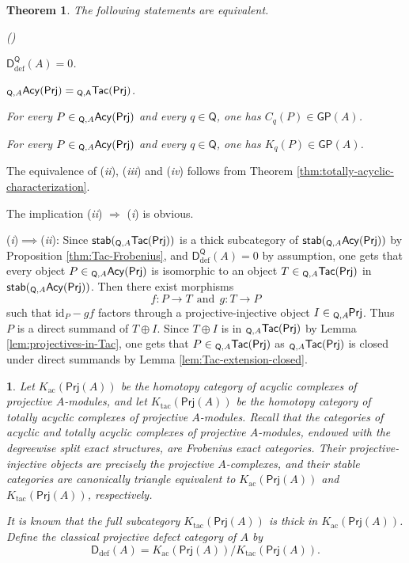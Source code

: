 \documentclass{amsart}
\theoremstyle{bfupright head,slanted body}
\theoremstyle{bfupright head,upright body}
\theoremstyle{fixed bf head,slanted body}
\newtheorem{thm}[res]{Theorem}          \newtheorem*{thm*}{Theorem}
\theoremstyle{fixed bf head,upright body}
\theoremstyle{numbered paragraph}
\newtheorem{ipg}[res]{}
\newlength{\thmlistleft}        %
\newlength{\thmlistright}       %
\newlength{\thmlistpartopsep}   %
\newlength{\thmlisttopsep}      %
\newlength{\thmlistparsep}      %
\newlength{\thmlistitemsep}     %
\newcounter{eqc}
\newenvironment{eqc}{\begin{list}{\upshape (\textit{\roman{eqc}})}%
		{\usecounter{eqc}%
			\setlength{\leftmargin}{\thmlistleft}%
			\setlength{\labelwidth}{\thmlistleft}%
			\setlength{\rightmargin}{\thmlistright}%
			\setlength{\partopsep}{\thmlistpartopsep}%
			\setlength{\topsep}{\thmlisttopsep}%
			\setlength{\parsep}{\thmlistparsep}%
			\setlength{\itemsep}{\thmlistitemsep}}}%
	{\end{list}}%
\newenvironment{prf*}[1][Proof]{%
	\begin{proof}[\bf #1]
		\setcounter{equation}{0}
		\renewcommand{\theequation}{\arabic{equation}}}
	{\end{proof}
}
\newcommand{\eqclbl}[1]{{\upshape(\textit{#1})}}
\newcommand{\proofofimp}[3][:]{\mbox{\eqclbl{#2}$\!\implies\!$\eqclbl{#3}#1}}
\numberwithin{equation}{res}
\newcommand{\GP}[1]{\mathsf{GP}(#1)}
\newcommand{\TacQ}{{}_{\Q,A}\mathsf{Tac}(\sf Prj)}
\newcommand{\AcQ}{{}_{\Q,A}\mathsf{Acy}(\sf Prj)}
\newcommand{\Prj}[1]{\mathsf{Prj}(#1)}
\newcommand{\Q}{\mathsf{Q}}
\newcommand{\id}{\mathrm{id}}
\newcommand{\lPrj}[1]{{}_{#1}\mspace{-1mu}{\sf{Prj}}}
\begin{document}
\begin{thm}\label{cor:defect-zero-criterion}
The following statements are equivalent.
\begin{eqc}
\item $\mathsf D_{\mathrm{def}}^{\Q}(A)=0$.
\item $\AcQ=\TacQ$.
\item For every $P\in\AcQ$ and every $q\in\Q$, one has $C_q(P)\in\GP{A}$.
\item For every $P\in\AcQ$ and every $q\in\Q$, one has $K_q(P)\in\GP{A}$.
\end{eqc}
\end{thm}

\begin{prf*}
The equivalence of \eqclbl{ii}, \eqclbl{iii} and \eqclbl{iv} follows from Theorem \ref{thm:totally-acyclic-characterization}.

The implication \eqclbl{ii} $\Longrightarrow$ \eqclbl{i} is obvious.

\proofofimp{i}{ii} Since $\mathsf{stab}(\TacQ)$ is a thick subcategory of $\mathsf{stab}(\AcQ)$ by Proposition \ref{thm:Tac-Frobenius}, and $\mathsf D_{\mathrm{def}}^{\Q}(A)=0$ by assumption, one gets that every object $P\in\AcQ$ is isomorphic to an object $T\in\TacQ$ in $\mathsf{stab}(\AcQ)$. Then there exist morphisms
$$f: P\to T\ \ \text{and}\ \ g: T\to P$$
such that $\id_P-gf$ factors through a projective-injective object $I\in\lPrj{\Q,A}$. Thus $P$ is a direct summand of $T\oplus I$. Since $T\oplus I$ is in $\TacQ$ by Lemma \ref{lem:projectives-in-Tac}, one gets that $P\in\TacQ$ as $\TacQ$ is closed under direct summands by Lemma \ref{lem:Tac-extension-closed}.
\end{prf*}

\begin{ipg}
Let $K_{\mathrm{ac}}(\Prj A)$ be the homotopy category of acyclic complexes of projective $A$-modules, and let $K_{\mathrm{tac}}(\Prj A)$ be the homotopy category of totally acyclic complexes of projective $A$-modules. Recall that the categories of acyclic and totally acyclic complexes of projective $A$-modules, endowed with the degreewise split exact structures, are Frobenius exact categories. Their projective-injective objects are precisely the projective $A$-complexes, and their stable categories are canonically triangle equivalent to $K_{\mathrm{ac}}(\Prj A)$ and $K_{\mathrm{tac}}(\Prj A)$, respectively.

It is known that the full subcategory $K_{\mathrm{tac}}(\Prj A)$ is thick in $K_{\mathrm{ac}}(\Prj A)$. Define the classical projective defect category of $A$ by
$$\mathsf D_{\mathrm{def}}(A)=K_{\mathrm{ac}}(\Prj A)\big/K_{\mathrm{tac}}(\Prj A).$$
\end{ipg}
\end{document}
